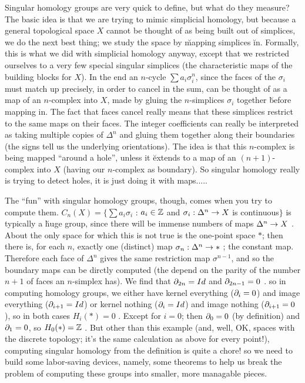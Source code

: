Singular homology groups are very quick to define, but what do they measure?
The basic idea is that we are trying to mimic simplicial homology, but because a
general topological space $X$ cannot be thought of as being built out of simplices,
we do the next best thing; we study the space by \u{mapping} simplices \u{in}. Formally,
this is what we did with simplicial homology anyway, except that we restricted 
ourselves to a very few special singular simplices (the characteristic maps of the
building blocks for $X$). In the end an $n$-cycle $\sum a_i\sigma_i^n$, since the 
faces of the $\sigma_i$ must match up precisely, in order to cancel in the sum, 
can be thought of as a map of an $n$-complex into $X$, made by gluing the
$n$-simplices $\sigma_i$ together \u{before} mapping in. The fact that faces
cancel really means that these simplices restrict to the same maps on their faces.
The integer coefficients can really be interpreted as taking multiple copies of 
$\Delta^n$ and gluing them together along their boundaries (the signs tell us
the underlying orientations). The idea is that this $n$-complex is being
mapped ``around a hole'', unless it \u{extends} to a map of an $(n+1)$-complex
into $X$ (having our $n$-complex as boundary). So singular homology really
is trying to detect holes, it is just doing it with maps.....

\msk

The ``fun'' with singular homology groups, though, comes when you try to compute them. 
$C_n(X) = \{\sum a_i\sigma_i$ : $a_i\in {\Bbb Z}$ and $\sigma_i:\Delta^n\rightarrow X$ 
is continuous$\}$ is typically a \u{huge} group, since there will be immense
numbers of maps $\Delta^n\rightarrow X$ . About the only space for which this is not true is
the one-point space $*$; then there is, for each $n$, exactly one (distinct)
map $\sigma_n :\Delta^n\rightarrow *$ ; the constant map. Therefore each face of $\Delta^n$
gives the same restriction map $\sigma^{n-1}$, and so the boundary maps can 
be dirctly computed (the depend on the parity of the number $n+1$ of faces 
an $n$-simplex has). We find that $\partial_{2n}=Id$ and $\partial_{2n-1}=0$ . so in 
computing homology groups, we either have kernel everything ($\partial_i=0$) and
image everything ($\partial_{i+1}=Id$) or kernel nothing ($\partial_i=Id$) and
image nothing ($\partial_{i+1}=0$), so in both cases $H_i(*)=0$ . Except for $i=0$;
then $\partial_0=0$ (by definition) and $\partial_1=0$, so $H_0(*)={\Bbb Z}$ .
But other than this example (and, well, OK, spaces with the discrete topology;
it's the same calculation as above for every point!), computing singular 
homology from the definition is quite a chore! so we need to build
some labor-saving devices, namely, some theorems to help us break the problem
of computing these groups into smaller, more managable pieces.

